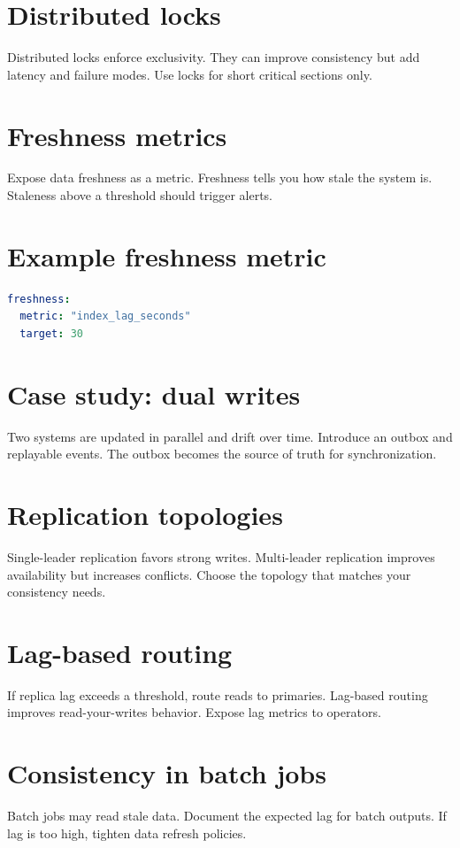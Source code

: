 \section{Distributed locks}
Distributed locks enforce exclusivity.
They can improve consistency but add latency and failure modes.
Use locks for short critical sections only.

\section{Freshness metrics}
Expose data freshness as a metric.
Freshness tells you how stale the system is.
Staleness above a threshold should trigger alerts.

\section{Example freshness metric}
\begin{lstlisting}[language=YAML]
freshness:
  metric: "index_lag_seconds"
  target: 30
\end{lstlisting}

\section{Case study: dual writes}
Two systems are updated in parallel and drift over time.
Introduce an outbox and replayable events.
The outbox becomes the source of truth for synchronization.

\section{Replication topologies}
Single-leader replication favors strong writes.
Multi-leader replication improves availability but increases conflicts.
Choose the topology that matches your consistency needs.

\section{Lag-based routing}
If replica lag exceeds a threshold, route reads to primaries.
Lag-based routing improves read-your-writes behavior.
Expose lag metrics to operators.

\section{Consistency in batch jobs}
Batch jobs may read stale data.
Document the expected lag for batch outputs.
If lag is too high, tighten data refresh policies.

